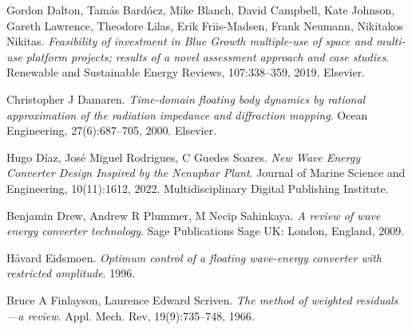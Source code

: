 \documentclass{article}
\begin{document}
\begin{thebibliography}{99}
Gordon Dalton, Tamás Bardócz, Mike Blanch, David Campbell, Kate Johnson, Gareth Lawrence, Theodore Lilas, Erik Friis-Madsen, Frank Neumann, Nikitakos Nikitas.
\textit{Feasibility of investment in Blue Growth multiple-use of space and multi-use platform projects; results of a novel assessment approach and case studies}.
Renewable and Sustainable Energy Reviews, 107:338--359, 2019.
Elsevier.

Christopher J Damaren.
\textit{Time-domain floating body dynamics by rational approximation of the radiation impedance and diffraction mapping}.
Ocean Engineering, 27(6):687--705, 2000.
Elsevier.

Hugo Díaz, José Miguel Rodrigues, C Guedes Soares.
\textit{New Wave Energy Converter Design Inspired by the Nenuphar Plant}.
Journal of Marine Science and Engineering, 10(11):1612, 2022.
Multidisciplinary Digital Publishing Institute.

Benjamin Drew, Andrew R Plummer, M Necip Sahinkaya.
\textit{A review of wave energy converter technology}.
Sage Publications Sage UK: London, England, 2009.

Håvard Eidsmoen.
\textit{Optimum control of a floating wave-energy converter with restricted amplitude}.
1996.

Bruce A Finlayson, Laurence Edward Scriven.
\textit{The method of weighted residuals—a review}.
Appl. Mech. Rev, 19(9):735--748, 1966.

\end{thebibliography}
\end{document}
